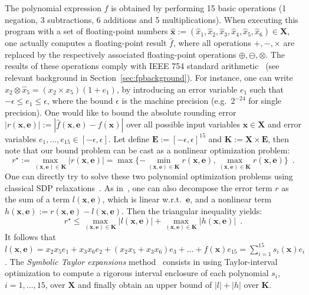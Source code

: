 \documentclass[a4paper,10pt]{article}
\newcommand{\x}{\mathbf{x}}
\newcommand{\e}{\mathbf{e}}
\def\E{\mathbf{E}}
\def\K{\mathbf{K}}
\def\X{\mathbf{X}}
\theoremstyle{plain}
\theoremstyle{definition}
\theoremstyle{remark}
\begin{document}
The polynomial expression $f$ is obtained by performing 15 basic operations (1 negation, 3 subtractions, 6 additions and 5 multiplications). 
When executing this program with a set of floating-point numbers $\hat{\x} :=  (\hat{x}_1, \hat{x}_2, \hat{x}_3, \hat{x}_4, \hat{x}_5, \hat{x}_6) \in \X$, one actually computes a floating-point result $\hat{f}$, where all operations $+, -, \times$ are replaced by the respectively associated floating-point operations $\oplus, \ominus, \otimes$. 
The results of these operations comply with IEEE 754 standard arithmetic~\cite{IEEE} (see relevant background in Section~\ref{sec:fpbackground}). For instance, one can write $\hat{x}_2 \otimes \hat{x}_5 =  (x_2 \times x_5) (1 + e_1)$, by introducing an error variable $e_1$ such that $-\epsilon \leq e_1 \leq \epsilon$, where the bound $\epsilon$ is the machine precision (e.g.~$2^{-24}$ for single precision). One would like to bound the absolute rounding error $|r(\x, \e)| := | \hat{f}(\x, \e) - f (\x) |$ over  all possible input variables $\x \in \X$ and error variables $e_1, \dots, e_{15} \in [-\epsilon, \epsilon]$. Let define $\E := [-\epsilon, \epsilon]^{15}$ and $\K := \X \times \E$, then note that our bound problem can be cast as a nonlinear optimization problem:
%
\begin{equation}
\label{eq:roptim}
r^\star := \max_{(\x, \e) \in \K} | r(\x, \e) | = \max \{-\min_{(\x, \e) \in \K} r(\x, \e), \max_{(\x, \e) \in \K} r(\x,\e)\} \enspace. 
\end{equation}
%
One can directly try to solve these two polynomial optimization problems using classical SDP relaxations~\cite{Lasserre01moments}.
As in~\cite{fptaylor15}, one can also decompose the error term $r$ as the sum of a term $l(\x,\e)$, which is linear w.r.t.~$\e$, and a nonlinear term $h(\x,\e) := r(\x,\e) - l(\x,\e)$. Then the triangular inequality yields:
%
\begin{equation}
\label{eq:lhoptim} 
r^\star \leq \max_{(\x, \e) \in \K} |l(\x, \e)| + \max_{(\x, \e) \in \K} |h(\x, \e)| \enspace. 
\end{equation}
%
It follows that $l(\x,\e) = x_2 x_5 e_1 + x_3 x_6 e_2 +  (x_2 x_5 + x_3 x_6) e_3 + \dots + f(\x) e_{15} = \sum_{i=1}^{15} s_i(\x) e_i$. The {\em Symbolic Taylor expansions} method~\cite{fptaylor15} consists in using Taylor-interval optimization to compute a rigorous interval enclosure of each polynomial $s_i$, $i = 1,\dots,15$, over $\X$ and finally obtain an upper bound of $|l| + |h|$ over $\K$.
\end{document}

